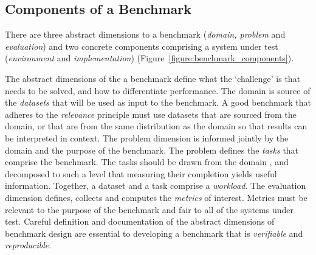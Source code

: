 \subsection{Components of a Benchmark}
There are three abstract dimensions to a benchmark (\textit{domain, problem} and \textit{evaluation}) and two concrete components comprising a system under test (\textit{environment} and \textit{implementation}) (Figure~\ref{figure:benchmark_components}).

The abstract dimensions of the a benchmark define what the `challenge' is that needs to be solved, and how to differentiate performance.
The domain is source of the \textit{datasets} that will be used as input to the benchmark.
A good benchmark that adheres to the \textit{relevance} principle must use datasets that are sourced from the domain, or that are from the same distribution as the domain so that results can be interpreted in context. 
The problem dimension is informed jointly by the domain and the purpose of the benchmark. 
The problem defines the \textit{tasks} that comprise the benchmark. 
The tasks should be drawn from the domain , and decomposed to such a level that measuring their completion yields useful information. 
Together, a dataset and a task comprise a \textit{workload}.
The evaluation dimension defines, collects and computes the \textit{metrics} of interest. 
Metrics must be relevant to the purpose of the benchmark and fair to all of the systems under test. 
Careful definition and documentation of the abstract dimensions of benchmark design are essential to developing a benchmark that is \textit{verifiable} and \textit{reproducible}.

